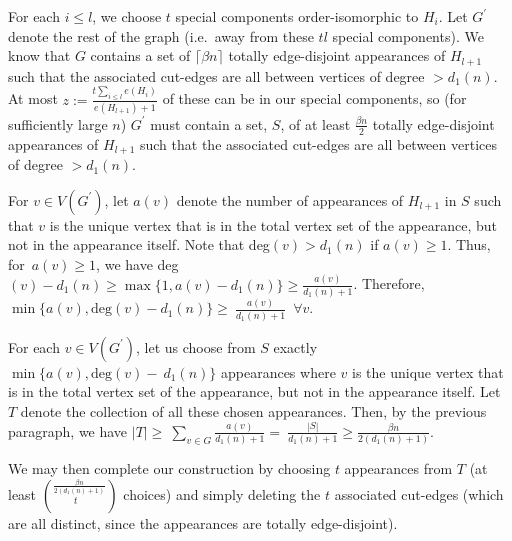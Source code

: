 \documentclass{article}
\newtheorem{Proof of Theorem}{Proof of Theorem}
\begin{document}
For each $i \leq l$,
we choose $t$ special components order-isomorphic to $H_{i}$.
Let $G^{\prime}$ denote the rest of the graph
(i.e.~away from these $tl$ special components).
We know that $G$ contains a set of $\lceil \beta n \rceil$
totally edge-disjoint appearances of $H_{l+1}$ 
such that the associated cut-edges are all between vertices of degree $>d_{1}(n)$.
At most $z:= \frac{ t \sum_{i \leq l}e(H_{i}) }{ e(H_{l+1})+1 }$
of these can be in our special components,
so (for sufficiently large $n$)
$G^{\prime}$ must contain a set, $S$,
of at least $\frac{\beta n}{2}$ 
totally edge-disjoint appearances of $H_{l+1}$ 
such that the associated cut-edges are all between vertices of degree $>d_{1}(n)$.

For $v \in V(G^{\prime})$,
let $a(v)$ denote the number of appearances of $H_{l+1}$ in $S$ 
such that $v$ is the unique vertex that is in the total vertex set of the appearance,
but not in the appearance itself.
Note that deg$(v)>d_{1}(n)$ if $a(v) \geq 1$.
Thus, for~$a(v) \geq 1$, we have
deg$(v)-d_{1}(n) \geq \max \{ 1, a(v)- d_{1}(n) \} \geq \frac{a(v)}{d_{1}(n)+1}$.
Therefore, $\min \{ a(v), \textrm{deg}(v)-d_{1}(n) \} \geq~\frac{a(v)}{d_{1}(n)+1}$~$\forall v$.

For each $v \in V(G^{\prime})$,
let us choose from $S$ exactly $\min \{ a(v), \textrm{deg}(v)-~\!d_{1}(n) \}$ appearances 
where $v$ is the unique vertex that is in the total vertex set of the appearance,
but not in the appearance itself.
Let $T$ denote the collection of all these chosen appearances.
Then, by the previous paragraph,
we have $|T| \geq~\sum_{v \in G} \frac{a(v)}{d_{1}(n)+1} =~\frac{|S|}{d_{1}(n)+1} \geq \frac{\beta n}{2(d_{1}(n)+1)}$. 

We may then complete our construction by choosing $t$ appearances from $T$
(at least $\left( ^{ \frac{\beta n}{2(d_{1}(n)+1)} } _{\phantom{www} t} \right)$ choices)
and simply deleting the $t$ associated cut-edges
(which are all distinct,
since the appearances are totally edge-disjoint).
\end{document}
